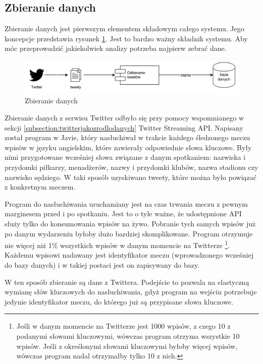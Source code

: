 \clearpage
\subsection{Zbieranie danych}
\label{subsection:zbieraniedanych}
Zbieranie danych jest pierwszym elementem składowym całego systemu.
Jego koncepcje przedstawia rysunek \ref{image:zbieranie-danych}.
Jest to bardzo ważny składnik systemu. Aby móc przeprowadzić jakiekolwiek
analizy potrzeba najpierw zebrać dane.

\begin{figure}[ht!]
\centering
\includegraphics[width=160mm]{img/zbieranie-danych.png}
\caption{Zbieranie danych}
\label{image:zbieranie-danych}
\end{figure}


Zbieranie danych z serwisu Twitter odbyło się przy pomocy wspomnianego w sekcji
\ref{subsection:twitterjakozrodlodanych} Twitter Streaming API. Napisany został
program w Javie, który nasłuchiwał w trakcie każdego śledzonego meczu wpisów w
języku angielskim, które zawierały odpowiednie słowa kluczowe. Były nimi
przygotowane wcześniej słowa związane z danym spotkaniem: nazwiska i przydomki
piłkarzy, menadżerów, nazwy i przydomki klubów, nazwa stadionu czy nazwisko
sędziego. W taki sposób uzyskiwano tweety, które można było powiązać z
konkretnym meczem.

Program do nasłuchiwania uruchamiany jest na czas trwania meczu z pewnym
marginesem przed i po spotkaniu. Jest to o tyle ważne, że udostępnione API służy
tylko do konsumowania wpisów na żywo. Pobranie tych samych wpisów już po danym
wydarzeniu byłoby dużo bardziej skomplikowane. Program otrzymuje nie więcej niż
1\% wszystkich wpisów w danym momencie na Twitterze \footnote{Jeśli w danym
momencie na Twitterze jest 1000 wpisów, z czego 10 z podanymi słowami
kluczowymi, wówczas program otrzyma wszystkie 10 wpisów. Jeśli z określonymi
słowami kluczowymi byłoby więcej wpisów, wówczas program nadal otrzymałby tylko
10 z nich.}. Każdemu wpisowi nadawany jest identyfikator meczu (wprowadzonego
wcześniej do bazy danych) i w takiej postaci jest on zapisywany do bazy.

W ten sposób zbieranie są dane z Twittera. Podejście to pozwala na elastyczną
wymianę słów kluczowych do nasłuchiwania, gdyż program na wejściu potrzebuje
jedynie identyfikator meczu, do którego już są przypisane słowa kluczowe.




